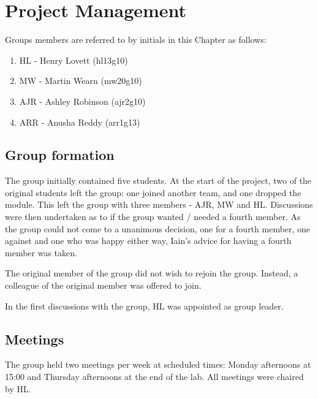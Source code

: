 
\chapter{Project Management}\label{ch:pm}


Groups members are referred to by initials in this Chapter as follows:
\begin{enumerate}
\item HL - Henry Lovett (hl13g10)
\item MW - Martin Wearn (mw20g10)
\item AJR - Ashley Robinson (ajr2g10)
\item ARR - Anusha Reddy (arr1g13)
\end{enumerate}

\section{Group formation}

The group initially contained five students. 
At the start of the project, two of the original students left the group: one joined another team, and one dropped the module.
This left the group with three members - AJR, MW and HL. 
Discussions were then undertaken as to if the group wanted / needed a fourth member. 
As the group could not come to a unanimous decision, one for a fourth member, one against and one who was happy either way, Iain's advice for having a fourth member was taken. 

The original member of the group did not wish to rejoin the group.
Instead, a colleague of the original member was offered to join.

In the first discussions with the group, HL was appointed as group leader. 

\section{Meetings}

The group held two meetings per week at scheduled times: Monday afternoons at 15:00 and Thursday afternoons at the end of the lab.
All meetings were chaired by HL.

